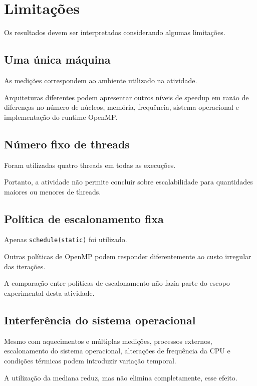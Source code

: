\section{Limitações}
\label{sec:atvd05-limitacoes}

Os resultados devem ser interpretados considerando algumas limitações.

\subsection{Uma única máquina}

As medições correspondem ao ambiente utilizado na atividade.

Arquiteturas diferentes podem apresentar outros níveis de speedup em razão
de diferenças no número de núcleos, memória, frequência, sistema operacional
e implementação do runtime OpenMP.


\subsection{Número fixo de threads}

Foram utilizadas quatro threads em todas as execuções.

Portanto, a atividade não permite concluir sobre escalabilidade para
quantidades maiores ou menores de threads.


\subsection{Política de escalonamento fixa}

Apenas \texttt{schedule(static)} foi utilizado.

Outras políticas de OpenMP podem responder diferentemente ao custo
irregular das iterações.

A comparação entre políticas de escalonamento não fazia parte do escopo
experimental desta atividade.


\subsection{Interferência do sistema operacional}

Mesmo com aquecimentos e múltiplas medições, processos externos,
escalonamento do sistema operacional, alterações de frequência da CPU e
condições térmicas podem introduzir variação temporal.

A utilização da mediana reduz, mas não elimina completamente, esse efeito.


